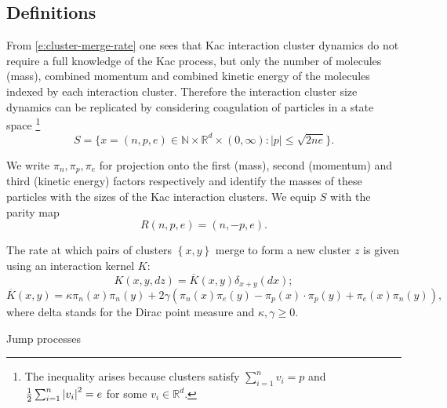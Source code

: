 \subsection{Definitions}
From \eqref{e:cluster-merge-rate} one sees that Kac interaction cluster dynamics do not require a full knowledge of the Kac process, but only the number of molecules (mass), combined momentum and combined kinetic energy of the molecules indexed by each interaction cluster.
Therefore the interaction cluster size dynamics can be replicated by considering coagulation of particles in a state space
\footnote{The inequality arises because clusters satisfy $\sum_{i=1}^n v_i = p$ and $\frac12 \sum_{i=1}^n \left\lvert{v_i}\right\rvert^2 = e$ for some $v_i \in \mathbb{R}^d$.}
\begin{equation}
    S=\{x=(n, p, e) \in \mathbb{N}\times \mathbb{R}^d\times (0,\infty): |p|\leq \sqrt{2ne} \}.
\end{equation}

We write $\pi_n, \pi_p, \pi_e$ for projection onto the first (mass), second (momentum) and third (kinetic energy) factors respectively and identify the masses of these particles with the sizes of the Kac interaction clusters. We equip $S$ with the parity map \begin{equation*}
    R(n,p,e)=(n,-p,e).
\end{equation*}


The rate at which pairs of clusters $\left\{ x,y \right\}$ merge to form a new cluster $z$ is given using an interaction kernel $K$:
\begin{equation}\label{eq: smoluchowski kernel}
    K(x,y,dz)=\overline{K}(x,y)\delta_{x+y}(dx);
    \end{equation} \begin{equation} \overline{K}(x,y)=\kappa \pi_n(x)\pi_n(y)+2\gamma\left(\pi_n(x)\pi_e(y)-\pi_p(x)\cdot \pi_p(y)+\pi_e(x)\pi_n(y)\right),
\end{equation}
where delta stands for the Dirac point measure and $\kappa, \gamma\ge 0$. 

Jump processes

